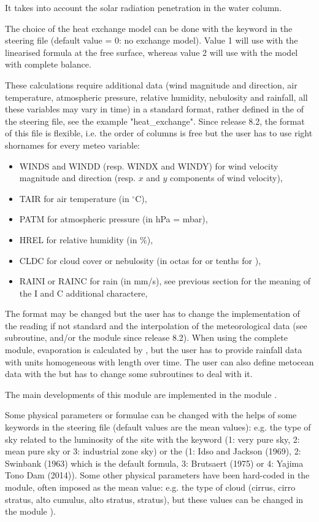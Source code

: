 It takes into account the solar radiation penetration in the water column.

The choice of the heat exchange model can be done with the keyword
 in the \waqtel steering file
(default value = 0: no exchange
model). Value 1 will use with the linearised formula at the free surface,
whereas value 2 will use with the model with complete balance.

These calculations require additional data (wind magnitude and direction, air
temperature, atmospheric pressure, relative humidity, nebulosity and rainfall,
all these variables may vary in time) in a standard format, rather defined
in the  of the  steering file,
see the example "heat\_exchange".
Since release 8.2, the format of this file is flexible, i.e. the order of
columns is free but the user has to use right shornames for every meteo variable:
\begin{itemize}
\item WINDS and WINDD (resp. WINDX and WINDY) for wind velocity magnitude and
direction (resp. $x$ and $y$ components of wind velocity),
\item TAIR for air temperature (in $^{\circ}$C),
\item PATM for atmospheric pressure (in hPa = mbar),
\item HREL for relative humidity (in \%),
\item CLDC for cloud cover or nebulosity (in octas for \waqtel or tenths for
\khione),
\item RAINI or RAINC for rain (in mm/s), see previous section for the meaning
of the I and C additional charactere,
\end{itemize}

The format may be changed but the user has to change the implementation of the
reading if not standard and the interpolation of the meteorological data
(see  subroutine, and/or the  module
since release 8.2).
When using the complete module, evaporation is calculated by , but
the user has to provide rainfall data with units homogeneous with length over
time.
The user can also define metocean data with the
 but has to change some subroutines
to deal with it.

The main developments of this module are implemented in the module
.

Some physical parameters or formulae can be changed with the helps of some
keywords in the \waqtel steering file (default values are the mean values): e.g.
the type of sky related to the luminosity of the site with the \waqtel keyword
 (1: very pure sky, 2: mean pure sky or 3:
industrial zone sky) or the 
(1: Idso and Jackson (1969), 2: Swinbank (1963) which is the default formula,
3: Brutsaert (1975) or 4: Yajima Tono Dam (2014)).
Some other physical parameters have been hard-coded in the module, often
imposed as the mean value: e.g. the type of cloud (cirrus,
cirro stratus, alto cumulus, alto stratus, stratus), but these values can be
changed in the module ).

